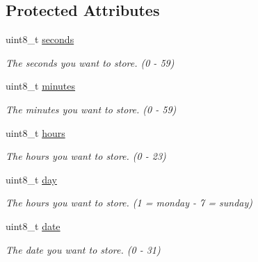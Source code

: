 \subsection*{Protected Attributes}
\begin{DoxyCompactItemize}
\item 
\mbox{\label{classtimestamp_a15ad236c6963bfbd6ae18416697c91c2}} 
uint8\+\_\+t \mbox{\hyperlink{classtimestamp_a15ad236c6963bfbd6ae18416697c91c2}{seconds}}
\begin{DoxyCompactList}\small\item\em The seconds you want to store. (0 -\/ 59) \end{DoxyCompactList}\item 
\mbox{\label{classtimestamp_a45c06ef17b96bdd37cd168faf772c63c}} 
uint8\+\_\+t \mbox{\hyperlink{classtimestamp_a45c06ef17b96bdd37cd168faf772c63c}{minutes}}
\begin{DoxyCompactList}\small\item\em The minutes you want to store. (0 -\/ 59) \end{DoxyCompactList}\item 
\mbox{\label{classtimestamp_a3b2f11626563cca00d60b323ceb15191}} 
uint8\+\_\+t \mbox{\hyperlink{classtimestamp_a3b2f11626563cca00d60b323ceb15191}{hours}}
\begin{DoxyCompactList}\small\item\em The hours you want to store. (0 -\/ 23) \end{DoxyCompactList}\item 
\mbox{\label{classtimestamp_a0102d6c44b2cc194a8186a42ff2bd58b}} 
uint8\+\_\+t \mbox{\hyperlink{classtimestamp_a0102d6c44b2cc194a8186a42ff2bd58b}{day}}
\begin{DoxyCompactList}\small\item\em The hours you want to store. (1 = monday -\/ 7 = sunday) \end{DoxyCompactList}\item 
\mbox{\label{classtimestamp_a7eb2eee5f6ef4258aab7779a639a93fd}} 
uint8\+\_\+t \mbox{\hyperlink{classtimestamp_a7eb2eee5f6ef4258aab7779a639a93fd}{date}}
\begin{DoxyCompactList}\small\item\em The date you want to store. (0 -\/ 31) \end{DoxyCompactList}\item 

\end{DoxyCompactItemize}

